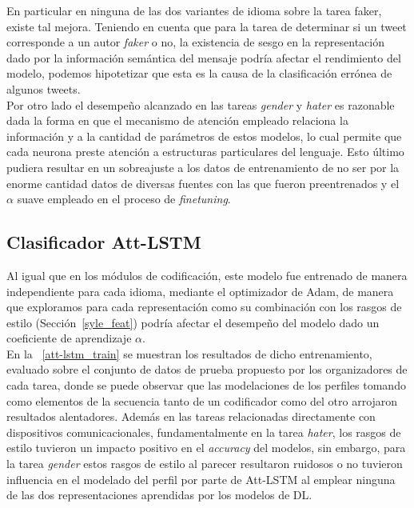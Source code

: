 	En particular en ninguna de las dos variantes de idioma sobre la tarea faker, existe tal mejora. Teniendo en cuenta que para la tarea de determinar si un tweet corresponde a un autor \textit{faker} o no, la existencia de sesgo en la representación dado por la información semántica del mensaje podría afectar el rendimiento del modelo, podemos hipotetizar que esta es la causa de la clasificación errónea de algunos tweets. \\
	Por otro lado el desempeño alcanzado en las tareas \textit{gender} y \textit{hater} es razonable dada la forma en que el mecanismo de atención empleado relaciona la información y a la cantidad de parámetros de estos modelos, lo cual permite que cada neurona  preste atención a estructuras particulares del lenguaje. Esto último pudiera resultar en un sobreajuste a los datos de entrenamiento de no ser por la enorme cantidad datos de diversas fuentes con las que fueron preentrenados y el $\alpha$ suave empleado en el proceso de \textit{finetuning}. 
	
	
	\subsection{Clasificador Att-LSTM}
	
	Al igual que en los módulos de codificación, este modelo fue entrenado de manera independiente para cada idioma, mediante el optimizador de Adam, de manera que exploramos para cada representación como su combinación con los rasgos de estilo (Sección~\ref{syle_feat}) podría afectar el desempeño del modelo dado un coeficiente de aprendizaje $\alpha$. \\
	En la \tablename~\ref{att-lstm_train} se muestran los resultados de dicho entrenamiento, evaluado sobre el conjunto de datos de prueba propuesto por los organizadores de cada tarea, donde se puede observar que las modelaciones de los perfiles tomando como elementos de la secuencia tanto de un codificador como del otro arrojaron resultados alentadores. Además en las tareas relacionadas directamente con dispositivos comunicacionales, fundamentalmente en la tarea \textit{hater}, los rasgos de estilo tuvieron un impacto positivo en el \textit{accuracy} del modelos, sin embargo, para la tarea \textit{gender} estos rasgos de estilo al parecer resultaron ruidosos o no  tuvieron influencia en el modelado del perfil por parte de Att-LSTM al emplear ninguna de las dos representaciones aprendidas por los modelos de DL.
	
